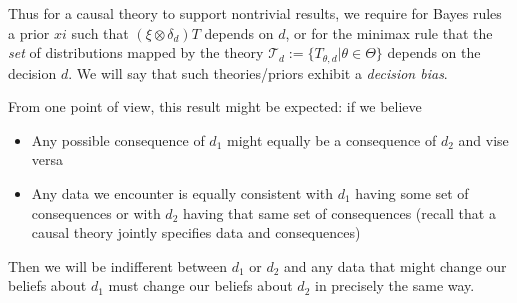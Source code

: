 Thus for a causal theory to support nontrivial results, we require for Bayes rules a prior $xi$ such that $(\xi\otimes \delta_d)T$ depends on $d$, or for the minimax rule that the \emph{set} of distributions mapped by the theory $\mathscr{T}_d:=\{T_{\theta,d}|\theta\in\Theta\}$ depends on the decision $d$. We will say that such theories/priors exhibit a \emph{decision bias}. 

From one point of view, this result might be expected: if we believe
\begin{itemize}
\item Any possible consequence of $d_1$ might equally be a consequence of $d_2$ and vise versa
\item Any data we encounter is equally consistent with $d_1$ having some set of consequences or with $d_2$ having that same set of consequences (recall that a causal theory jointly specifies data and consequences)
\end{itemize}
Then we will be indifferent between $d_1$ or $d_2$ and any data that might change our beliefs about $d_1$ must change our beliefs about $d_2$ in precisely the same way.

